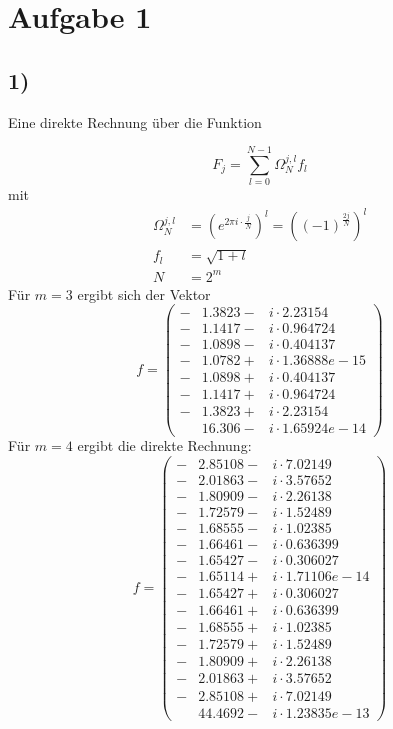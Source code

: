 \section*{Aufgabe 1}
\subsection*{1)} 
Eine direkte Rechnung über die Funktion 

\begin{equation}
    F_j = \sum_{l=0}^{N-1}\Omega_N^{j, l} f_l
\end{equation}
mit 
\begin{align}
    \Omega_N^{j, l} &= (e^{2 \pi i \cdot \frac{j}{N}})^{l} = \left((-1)^{\frac{2j}{N}}\right)^{l} \\
    f_l &= \sqrt{1+l} \\
    N &= 2^m
\end{align}
Für $m = 3$ ergibt sich der Vektor
\begin{equation}
    f = 
    \begin{pmatrix} 
        -&1.3823 -& i \cdot 2.23154 \\
        -&1.1417 -& i \cdot 0.964724 \\
        -&1.0898 -& i \cdot 0.404137 \\
        -&1.0782 +& i \cdot 1.36888e-15 \\
        -&1.0898 +& i \cdot 0.404137 \\
        -&1.1417 +& i \cdot 0.964724 \\
        -&1.3823 +& i \cdot 2.23154 \\
         &16.306 -& i \cdot 1.65924e-14
    \end{pmatrix}
\end{equation}
Für $m = 4$ ergibt die direkte Rechnung:
\begin{equation}
    f =
    \begin{pmatrix}
        -&2.85108 -& i \cdot 7.02149  \\
        -&2.01863 -& i \cdot 3.57652 \\
        -&1.80909 -& i \cdot 2.26138 \\
        -&1.72579 -& i \cdot 1.52489 \\
        -&1.68555 -& i \cdot 1.02385 \\
        -&1.66461 -& i \cdot 0.636399 \\
        -&1.65427 -& i \cdot 0.306027 \\
        -&1.65114 +& i \cdot 1.71106e-14 \\
        -&1.65427 +& i \cdot 0.306027 \\
        -&1.66461 +& i \cdot 0.636399 \\
        -&1.68555 +& i \cdot 1.02385 \\
        -&1.72579 +& i \cdot 1.52489 \\
        -&1.80909 +& i \cdot 2.26138 \\
        -&2.01863 +& i \cdot 3.57652 \\
        -&2.85108 +& i \cdot 7.02149 \\
         &44.4692 -& i \cdot 1.23835e-13
    \end{pmatrix}
\end{equation}
